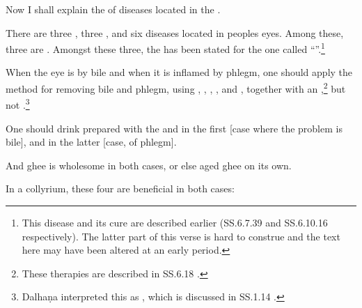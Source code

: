 \begin{translation}
    
    \item[1]  Now I shall explain the  of diseases
    located in the .
    
    \item[2]  There are three , three ,
    and six  diseases located in peoples eyes. Among these,
    three are . Amongst these three, %
    the  has been stated for the one called
    “”.\footnote{This disease and its cure are 
    described earlier (SS.6.7.39 and SS.6.10.16 
    \citep[609 and 614]{vulgate} respectively). The latter part of this verse is
    hard to construe and the text here may have been altered at an early period.}
    
    \item[3--5ab]  When the eye is  by bile and when it is 
    inflamed 
    by phlegm, one should apply the method for removing bile and phlegm, using 
    , 
    ,
    ,
    , and 
    ,
    together with an ,\footnote{These therapies are 
    described in 
    SS.6.18 
    \citep[633--640]{vulgate}.} but not 
    .\footnote{Dalhaṇa interpreted this as 
    , which is discussed in SS.1.14 \citep[]{vulgate}.}
    
    One should drink  prepared with the  
    and in the first [case where the problem is bile], and  in the 
    latter [case, of phlegm].
    
    And ghee  is wholesome in both cases, or else 
    aged ghee on its own.
    
    \item[5cd--7ab]
    
    In a collyrium, these four  are beneficial in both cases:
    \begin{itemize}
        

\end{itemize}
\end{translation}
